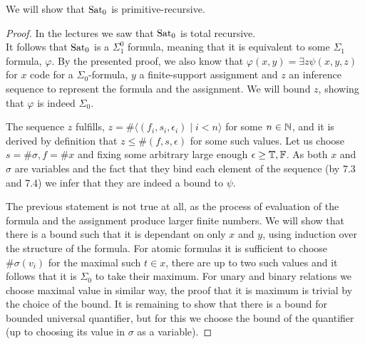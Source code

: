 \question[3]
We will show that $\operatorname{Sat}_0$ is primitive-recursive.
\begin{proof}
	In the lectures we saw that $\operatorname{Sat}_0$ is total recursive. \\
	It follows that $\operatorname{Sat}_0$ is a $\Sigma_1^0$ formula, meaning that it is equivalent to some $\Sigma_1$ formula, $\varphi$.
	By the presented proof, we also know that $\varphi(x, y) = \exists z \psi(x, y, z)$ for $x$ code for a $\Sigma_0$-formula,
	$y$ a finite-support assignment and $z$ an inference sequence to represent the formula and the assignment.
	We will bound $z$, showing that $\varphi$ is indeed $\Sigma_0$.

	The sequence $z$ fulfills, $z = \# \langle (f_i, s_i, \epsilon_i) \mid i < n \rangle$ for some $n \in \mathbb{N}$, and it is derived by definition that $z \le \# (f, s, \epsilon)$ for some such values.
	Let us choose $s = \# \sigma, f = \# x$ and fixing some arbitrary large enough $\epsilon \ge \mathbb{T}, \mathbb{F}$.
	As both $x$ and $\sigma$ are variables and the fact that they bind each element of the sequence (by 7.3 and 7.4) we infer that they are indeed a bound to $\psi$.

	The previous statement is not true at all, as the process of evaluation of the formula and the assignment produce larger finite numbers.
	We will show that there is a bound such that it is dependant on only $x$ and $y$, using induction over the structure of the formula.
	For atomic formulas it is sufficient to choose $\# \sigma(v_i)$ for the maximal such $t \in x$, there are up to two such values and it follows that it is $\Sigma_0$ to take their maximum.
	For unary and binary relations we choose maximal value in similar way, the proof that it is maximum is trivial by the choice of the bound.
	It is remaining to show that there is a bound for bounded universal quantifier, but for this we choose the bound of the quantifier (up to choosing its value in $\sigma$ as a variable).
\end{proof}

